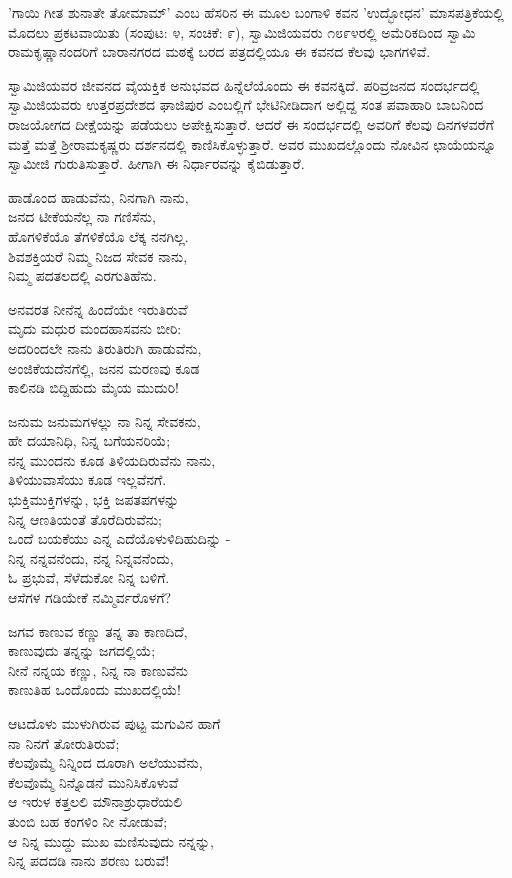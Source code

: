 'ಗಾಯಿ ಗೀತ ಶುನಾತೇ ತೋಮಾಮ್' ಎಂಬ ಹೆಸರಿನ ಈ ಮೂಲ ಬಂಗಾಳಿ ಕವನ 'ಉದ್ಭೋಧನ' ಮಾಸಪತ್ರಿಕೆಯಲ್ಲಿ ಮೊದಲು ಪ್ರಕಟವಾಯಿತು (ಸಂಪುಟ: ೪, ಸಂಚಿಕೆ: ೯), ಸ್ವಾಮಿಜಿಯವರು ೧೮೯೪ರಲ್ಲಿ ಅಮೆರಿಕದಿಂದ ಸ್ವಾಮಿ ರಾಮಕೃಷ್ಣಾನಂದರಿಗೆ ಬಾರಾನಗರದ ಮಠಕ್ಕೆ ಬರದ ಪತ್ರದಲ್ಲಿಯೂ ಈ ಕವನದ ಕೆಲವು ಭಾಗಗಳಿವೆ.

ಸ್ವಾಮಿಜಿಯವರ ಜೀವನದ ವೈಯಕ್ತಿಕ ಅನುಭವದ ಹಿನ್ನೆಲೆಯೊಂದು ಈ ಕವನಕ್ಕಿದೆ. ಪರಿವ್ರಜನದ ಸಂದರ್ಭದಲ್ಲಿ ಸ್ವಾಮಿಜಿಯವರು ಉತ್ತರಪ್ರದೇಶದ ಘಾಜಿಪುರ ಎಂಬಲ್ಲಿಗೆ ಭೇಟಿನೀಡಿದಾಗ ಅಲ್ಲಿದ್ದ ಸಂತ ಪವಾಹಾರಿ ಬಾಬನಿಂದ ರಾಜಯೋಗದ ದೀಕ್ಷೆಯನ್ನು ಪಡೆಯಲು ಅಪೇಕ್ಷಿಸುತ್ತಾರೆ. ಆದರೆ ಈ ಸಂದರ್ಭದಲ್ಲಿ ಅವರಿಗೆ ಕೆಲವು ದಿನಗಳವರೆಗೆ ಮತ್ತೆ ಮತ್ತೆ ಶ‍್ರೀರಾಮಕೃಷ್ಣರು ದರ್ಶನದಲ್ಲಿ ಕಾಣಿಸಿಕೊಳ್ಳುತ್ತಾರೆ. ಅವರ ಮುಖದಲ್ಲೊಂದು ನೋವಿನ ಛಾಯೆಯನ್ನೂ ಸ್ವಾಮೀಜಿ ಗುರುತಿಸುತ್ತಾರೆ. ಹೀಗಾಗಿ ಈ ನಿರ್ಧಾರವನ್ನು ಕೈಬಿಡುತ್ತಾರೆ.

ಹಾಡೊಂದ ಹಾಡುವೆನು, ನಿನಗಾಗಿ ನಾನು,\\ಜನದ ಟೀಕೆಯನೆಲ್ಲ ನಾ ಗಣಿಸೆನು,\\ಹೊಗಳಿಕೆಯೊ ತೆಗಳಿಕೆಯೊ ಲೆಕ್ಕ ನನಗಿಲ್ಲ.\\ಶಿವಶಕ್ತಿಯರೆ ನಿಮ್ಮ ನಿಜದ ಸೇವಕ ನಾನು,\\ನಿಮ್ಮ ಪದತಲದಲ್ಲಿ ಎರಗುತಿಹೆನು.

ಅನವರತ ನೀನೆನ್ನ ಹಿಂದೆಯೇ ಇರುತಿರುವೆ\\ಮೃದು ಮಧುರ ಮಂದಹಾಸವನು ಬೀರಿ:\\ಅದರಿಂದಲೇ ನಾನು ತಿರುತಿರುಗಿ ಹಾಡುವೆನು,\\ಅಂಜಿಕೆಯದೆನಗೆಲ್ಲಿ, ಜನನ ಮರಣವು ಕೂಡ\\ಕಾಲಿನಡಿ ಬಿದ್ದಿಹುದು ಮೈಯ ಮುದುರಿ!

ಜನುಮ ಜನುಮಗಳಲ್ಲು ನಾ ನಿನ್ನ ಸೇವಕನು,\\ಹೇ ದಯಾನಿಧಿ, ನಿನ್ನ ಬಗೆಯನರಿಯೆ;\\ನನ್ನ ಮುಂದನು ಕೂಡ ತಿಳಿಯದಿರುವೆನು ನಾನು,\\ತಿಳಿಯುವಾಸೆಯು ಕೂಡ ಇಲ್ಲವೆನಗೆ.\\ಭುಕ್ತಿಮುಕ್ತಿಗಳನ್ನು, ಭಕ್ತಿ ಜಪತಪಗಳನ್ನು\\ನಿನ್ನ ಆಣತಿಯಂತೆ ತೊರೆದಿರುವೆನು;\\ಒಂದೆ ಬಯಕೆಯು ಎನ್ನ ಎದೆಯೊಳುಳಿದಿಹುದಿನ್ನು -\\ನಿನ್ನ ನನ್ನವನೆಂದು, ನನ್ನ ನಿನ್ನವನೆಂದು,\\ಓ ಪ್ರಭುವೆ, ಸೆಳೆದುಕೋ ನಿನ್ನ ಬಳಿಗೆ.\\ಆಸೆಗಳ ಗಡಿಯೇಕೆ ನಮ್ಮಿರ್ವರೊಳಗೆ?

ಜಗವ ಕಾಣುವ ಕಣ್ಣು ತನ್ನ ತಾ ಕಾಣದಿದೆ,\\ಕಾಣುವುದು ತನ್ನನ್ನು ಜಗದಲ್ಲಿಯೆ;\\ನೀನೆ ನನ್ನಯ ಕಣ್ಣು, ನಿನ್ನ ನಾ ಕಾಣುವೆನು\\ಕಾಣುತಿಹ ಒಂದೊಂದು ಮುಖದಲ್ಲಿಯೆ!

ಆಟದೊಳು ಮುಳುಗಿರುವ ಪುಟ್ಟ ಮಗುವಿನ ಹಾಗೆ\\ನಾ ನಿನಗೆ ತೋರುತಿರುವೆ;\\ಕೆಲವೊಮ್ಮೆ ನಿನ್ನಿಂದ ದೂರಾಗಿ ಅಲೆಯುವೆನು,\\ಕೆಲವೊಮ್ಮೆ ನಿನ್ನೊಡನೆ ಮುನಿಸಿಕೊಳುವೆ\\ಆ ಇರುಳ ಕತ್ತಲಲಿ ಮೌನಾಶ್ರುಧಾರೆಯಲಿ\\ತುಂಬಿ ಬಹ ಕಂಗಳಿಂ ನೀ ನೋಡುವೆ;\\ಆ ನಿನ್ನ ಮುದ್ದು ಮುಖ ಮಣಿಸುವುದು ನನ್ನನ್ನು,\\ನಿನ್ನ ಪದದಡಿ ನಾನು ಶರಣು ಬರುವೆ!


